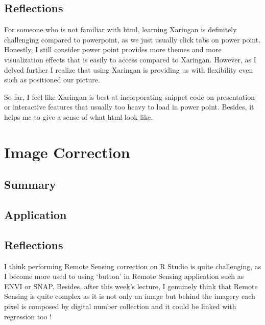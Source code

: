 \documentclass[
  letterpaper,
  DIV=11,
  numbers=noendperiod]{scrreprt}
\begin{document}
\hypertarget{reflections}{%
\section{Reflections}\label{reflections}}

For someone who is not familiar with html, learning Xaringan is
definitely challenging compared to powerpoint, as we just usually click
tabs on power point. Honestly, I still consider power point provides
more themes and more visualization effects that is easily to access
compared to Xaringan. However, as I delved further I realize that using
Xaringan is providing us with flexibility even such as positioned our
picture.

So far, I feel like Xaringan is best at incorporating snippet code on
presentation or interactive features that usually too heavy to load in
power point. Besides, it helps me to give a sense of what html look
like.


\hypertarget{image-correction}{%
\chapter{Image Correction}\label{image-correction}}

\hypertarget{summary-2}{%
\section{Summary}\label{summary-2}}

\hypertarget{application-1}{%
\section{Application}\label{application-1}}

\hypertarget{reflections-1}{%
\section{Reflections}\label{reflections-1}}

I think performing Remote Sensing correction on R Studio is quite
challenging, as I become more used to using `button' in Remote Sensing
application such as ENVI or SNAP. Besides, after this week's lecture, I
genuinely think that Remote Sensing is quite complex as it is not only
an image but behind the imagery each pixel is composed by digital number
collection and it could be linked with regression too !
\end{document}
